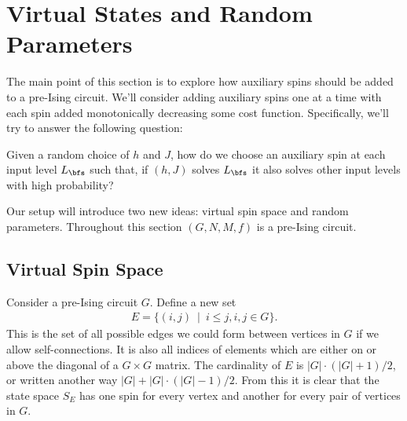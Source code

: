 \documentclass[raggedright, nofonts, notitlepage, openany, debug]{tufte-book}
\begin{document}
\chapter{Virtual States and Random Parameters}
The main point of this section is to explore how auxiliary spins should be added to a pre-Ising circuit. We'll consider adding auxiliary spins one at a time with each spin added monotonically decreasing some cost function. Specifically, we'll try to answer the following question: 
\begin{question}
  Given a random choice of $h$ and $J$, how do we choose an auxiliary spin at each input level $L_\bfs$ such that, if $(h,J)$ solves $L_\bfs$ it also solves other input levels with high probability?
\end{question}
Our setup will introduce two new ideas: virtual spin space and random parameters. Throughout this section $(G,N,M,f)$ is a pre-Ising circuit.

\section{Virtual Spin Space}
Consider a pre-Ising circuit $G$. Define a new set
\begin{align*}
  E = \{(i,j) ~ \mid ~ i \leq j, i,j \in G\}.
\end{align*}
This is the set of all possible edges we could form between vertices in $G$ if we allow self-connections. It is also all indices of elements which are either on or above the diagonal of a $G\times G$ matrix. The cardinality of $E$ is $|G|\cdot(|G|+1)/2$, or written another way $|G| + |G|\cdot(|G|-1)/2$. From this it is clear that the state space $S_E$ has one spin for every vertex and another for every pair of vertices in $G$.
\end{document}

